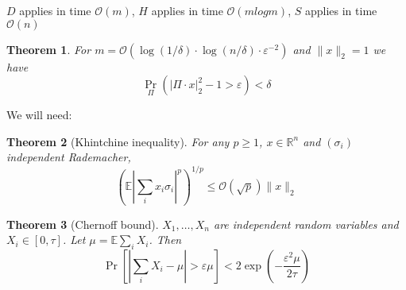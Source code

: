 \documentclass[11pt]{article}
\newtheorem{theorem}{Theorem}
\newcommand{\E}{{\mathbb E}}
\newcommand{\eps}{\varepsilon}
\newcommand{\bigo}{\mathcal{O}}
\begin{document}
$D$ applies in time $\bigo(m)$, $H$ applies in time $\bigo(m log m)$, $S$ applies in time $\bigo(n)$



\begin{theorem}
For $m = \bigo(\log(1/\delta) \cdot \log(n/\delta) \cdot \eps^{-2})$ and $\|x\|_2 = 1$ we have 
$$\Pr_{\Pi} ( | \Pi \cdot x |_2^2 - 1  > \eps) < \delta $$
\end{theorem}

We will need:
\begin{theorem}[Khintchine inequality]
For any $p \ge 1$, $x \in \mathbb{R}^n$ and $(\sigma_i)$ independent Rademacher,
$$ \left( \E \left|\sum_i x_i \sigma_i\right|^p \right)^{1/p} \le \bigo(\sqrt{p}) \| x \|_2 $$
\end{theorem}
\begin{theorem}[Chernoff bound]
$X_1,\ldots,X_n$ are independent random variables and $X_i \in [0,\tau]$. Let $\mu = \E \sum_i X_i $. Then
$$\Pr[ | \sum_i X_i - \mu| > \eps \mu ] < 2 \exp(- \frac{\eps^2 \mu}{2 \tau} )$$
\end{theorem}
\end{document}

